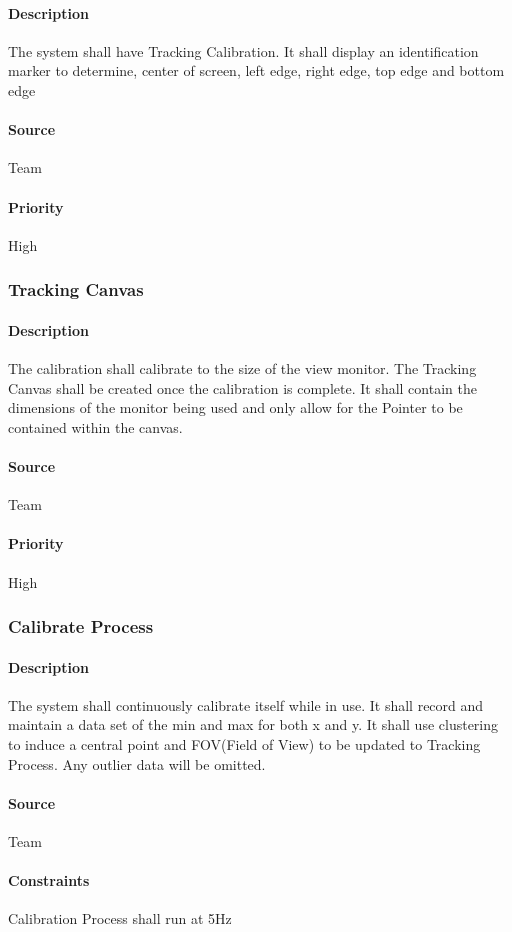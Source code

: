 \paragraph{Description}
The system shall have Tracking Calibration.  It shall display an identification marker to determine, center of screen, left edge, right edge, top edge and bottom edge
\paragraph{Source}
Team
\paragraph{Priority}
High
\subsubsection{Tracking Canvas}
\paragraph{Description}
The calibration shall calibrate to the size of the view monitor.  The Tracking Canvas shall be created once the calibration is complete.  It shall contain the dimensions of the monitor being used and only allow for the Pointer to be contained within the canvas.
\paragraph{Source}
Team
\paragraph{Priority}
High
\subsubsection{Calibrate Process}
\paragraph{Description}
The system shall continuously calibrate itself while in use.  It shall record and maintain a data set of the min and max for both x and y.  It shall use clustering to induce a central point and FOV(Field of View) to be updated to Tracking Process.  Any outlier data will be omitted.
\paragraph{Source}
Team
\paragraph{Constraints}
Calibration Process shall run at 5Hz
